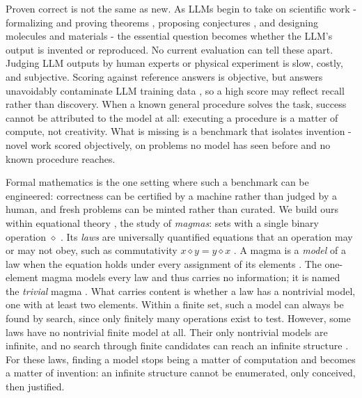 \documentclass[letterpaper]{article} %
\newcommand{\op}{\diamond}
\begin{document}


Proven correct is not the same as new. As LLMs begin to take on scientific work - formalizing and proving theorems \citep{yang2023leandojo, xin2024deepseek}, proposing conjectures \citep{romera2024mathematical, gottweis2026accelerating, lu2024ai}, and designing molecules and materials \citep{jumper2021highly, merchant2023scaling} - the essential question becomes whether the LLM's output is invented or reproduced. No current evaluation can tell these apart. Judging LLM outputs by human experts or physical experiment is slow, costly, and subjective. Scoring against reference answers is objective, but answers unavoidably contaminate LLM training data \citep{xu2024benchmark, chen2025recent}, so a high score may reflect recall rather than discovery. When a known general procedure solves the task, success cannot be attributed to the model at all: executing a procedure is a matter of compute, not creativity. What is missing is a benchmark that isolates invention - novel work scored objectively, on problems no model has seen before and no known procedure reaches. 

Formal mathematics is the one setting where such a benchmark can be engineered: correctness can be certified by a machine rather than judged by a human, and fresh problems can be minted rather than curated. We build ours within equational theory \citep{birkhoff1935structure}, the study of \textit{magmas}: sets with a single binary operation $\op$ \citep{burris1981course}. Its \textit{laws} are universally quantified equations that an operation may or may not obey, such as commutativity $x \op y = y \op x$ \citep{burris1981course, baader1998term}. A magma is a \textit{model} of a law when the equation holds under every assignment of its elements \citep{burris1981course}. The one-element magma models every law and thus carries no information; it is named the \textit{trivial} magma \citep{burris1981course}. What carries content is whether a law has a nontrivial model, one with at least two elements. Within a finite set, such a model can always be found by search, since only finitely many operations exist to test. However, some laws have no nontrivial finite model at all. Their only nontrivial models are infinite, and no search through finite candidates can reach an infinite structure \citep{kisielewicz1997austin, bolan2025equational}. For these laws, finding a model stops being a matter of computation and becomes a matter of invention: an infinite structure cannot be enumerated, only conceived, then justified. 
\end{document}
